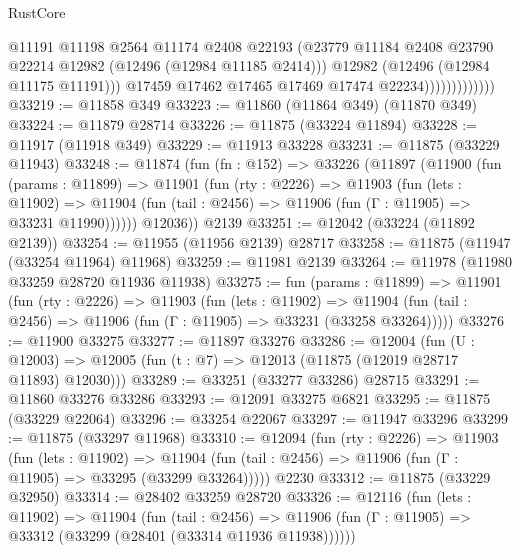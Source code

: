 \begin{lexlean}{RustCore}
\begin{coremodule}
                                @11191
                                @11198
                                @2564
                                @11174
                                @2408
                                @22193
                                (@23779
                                  @11184
                                  @2408
                                  @23790
                                  @22214
                                  @12982
                                  (@12496 (@12984 @11185 @2414)))
                                @12982
                                (@12496 (@12984 @11175 @11191)))
                              @17459
                              @17462
                              @17465
                              @17469
                              @17474
                              @22234)))))))))))))
@33219 := @11858 @349
@33223 := @11860 (@11864 @349) (@11870 @349)
@33224 := @11879 @28714
@33226 := @11875 (@33224 @11894)
@33228 := @11917 (@11918 @349)
@33229 := @11913 @33228
@33231 := @11875 (@33229 @11943)
@33248 := @11874
    (fun (fn : @152) =>
    @33226
      (@11897
        (@11900
          (fun (params : @11899) =>
          @11901
            (fun (rty : @2226) =>
            @11903
              (fun (lets : @11902) =>
              @11904 (fun (tail : @2456) => @11906 (fun (Γ : @11905) => @33231 @11990))))))
        @12036))
    @2139
@33251 := @12042 (@33224 (@11892 @2139))
@33254 := @11955 (@11956 @2139) @28717
@33258 := @11875 (@11947 (@33254 @11964) @11968)
@33259 := @11981 @2139
@33264 := @11978 (@11980 @33259 @28720 @11936 @11938)
@33275 := fun (params : @11899) =>
  @11901
    (fun (rty : @2226) =>
    @11903
      (fun (lets : @11902) =>
      @11904 (fun (tail : @2456) => @11906 (fun (Γ : @11905) => @33231 (@33258 @33264)))))
@33276 := @11900 @33275
@33277 := @11897 @33276
@33286 := @12004
    (fun (U : @12003) => @12005 (fun (t : @7) => @12013 (@11875 (@12019 @28717 @11893) @12030)))
@33289 := @33251 (@33277 @33286) @28715
@33291 := @11860 @33276 @33286
@33293 := @12091 @33275 @6821
@33295 := @11875 (@33229 @22064)
@33296 := @33254 @22067
@33297 := @11947 @33296
@33299 := @11875 (@33297 @11968)
@33310 := @12094
    (fun (rty : @2226) =>
    @11903
      (fun (lets : @11902) =>
      @11904 (fun (tail : @2456) => @11906 (fun (Γ : @11905) => @33295 (@33299 @33264)))))
    @2230
@33312 := @11875 (@33229 @32950)
@33314 := @28402 @33259 @28720
@33326 := @12116
    (fun (lets : @11902) =>
    @11904
      (fun (tail : @2456) =>
      @11906 (fun (Γ : @11905) => @33312 (@33299 (@28401 (@33314 @11936 @11938))))))

\end{coremodule}
\end{lexlean}
